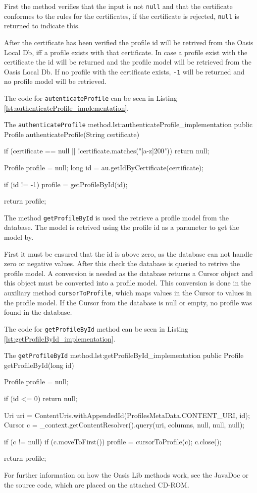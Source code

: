 First the method verifies that the input is not \texttt{null} and that the certificate conformes to the rules for the certificates, if the certificate is rejected, \texttt{null} is returned to indicate this.

After the certificate has been verified the profile id will be retrived from the Oasis Local Db, iff a profile exists with that certificate.
In case a profile exist with the certificate the id will be returned and the profile model will be retrieved from the Oasis Local Db.
If no profile with the certificate exists, \texttt{-1} will be returned and no profile model will be retrieved.

The code for \texttt{autenticateProfile} can be seen in Listing \vref{lst:authenticateProfile_implementation}.

\begin{Java}{The \texttt{authenticateProfile} method.}{lst:authenticateProfile_implementation}
public Profile authenticateProfile(String certificate) {
	if (certificate == null || !certificate.matches("[a-z]{200}")) {
		return null;
	}

	Profile profile = null;
	long id = au.getIdByCertificate(certificate);

	if (id != -1) {
		profile = getProfileById(id);
	}

	return profile;
}
\end{Java}

The method \texttt{getProfileById} is used the retrieve a profile model from the database.
The model is retrived using the profile id as a parameter to get the model by.

First it must be ensured that the id is above zero, as the database can not handle zero or negative values.
After this check the database is queried to retrive the profile model.
A conversion is needed as the database returns a Cursor object and this object must be converted into a profile model. \cite{Cursor}
This conversion is done in the auxiliary method \texttt{cursorToProfile}, which maps values in the Cursor to values in the profile model.
If the Cursor from the database is null or empty, no profile was found in the database.

\newpage
The code for \texttt{getProfileById} method can be seen in Listing \vref{lst:getProfileById_implementation}.

\begin{Java}{The \texttt{getProfileById} method.}{lst:getProfileById_implementation}
public Profile getProfileById(long id) {
	Profile profile = null;
	
	if (id <= 0) {
		return null;
	}
	
	Uri uri = ContentUris.withAppendedId(ProfilesMetaData.CONTENT_URI, id);
	Cursor c = _context.getContentResolver().query(uri, columns, null, null, null);

	if (c != null) {
		if (c.moveToFirst()) {
			profile = cursorToProfile(c);
		}
		c.close();
	}

	return profile;
}
\end{Java}

For further information on how the Oasis Lib methods work, see the JavaDoc or the source code, which are placed on the attached CD-ROM. 